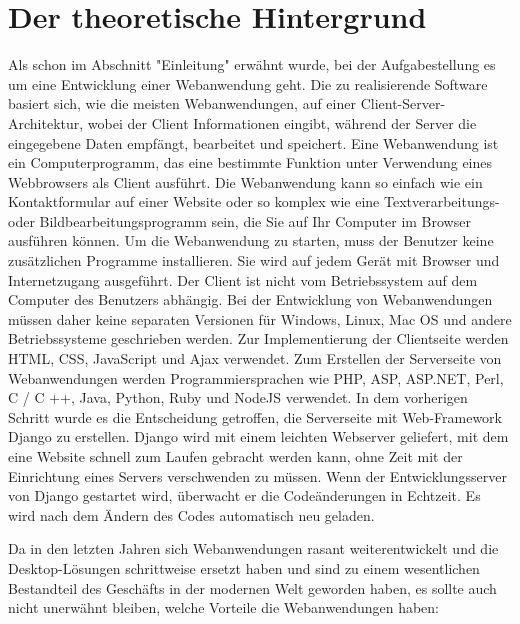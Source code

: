 \chapter{Der theoretische Hintergrund}
\label{sec:theorie}
Als schon im Abschnitt "Einleitung" erwähnt wurde, bei der Aufgabestellung es um eine Entwicklung einer Webanwendung geht. Die zu realisierende Software basiert sich, wie die meisten Webanwendungen, auf einer Client-Server-Architektur, wobei der Client Informationen eingibt, während der Server die eingegebene Daten empfängt, bearbeitet und speichert. Eine Webanwendung ist ein Computerprogramm, das eine bestimmte Funktion unter Verwendung eines Webbrowsers als Client ausführt. Die Webanwendung kann so einfach wie ein Kontaktformular auf einer Website oder so komplex wie eine Textverarbeitungs- oder Bildbearbeitungsprogramm sein, die Sie auf Ihr Computer im Browser ausführen können. Um die Webanwendung zu starten, muss der Benutzer keine zusätzlichen Programme installieren. Sie wird auf jedem Gerät mit Browser und Internetzugang ausgeführt. Der Client ist nicht vom Betriebssystem auf dem Computer des Benutzers abhängig. Bei der Entwicklung von Webanwendungen müssen daher keine separaten Versionen für Windows, Linux, Mac OS und andere Betriebssysteme geschrieben werden. Zur Implementierung der Clientseite werden HTML, CSS, JavaScript und Ajax verwendet. Zum Erstellen der Serverseite von Webanwendungen werden Programmiersprachen wie PHP, ASP, ASP.NET, Perl, C / C ++, Java, Python, Ruby und NodeJS verwendet. In dem vorherigen Schritt wurde es die Entscheidung getroffen, die Serverseite mit Web-Framework Django zu erstellen. Django wird mit einem leichten Webserver geliefert, mit dem eine  Website schnell zum Laufen gebracht werden kann, ohne Zeit mit der Einrichtung eines Servers verschwenden zu müssen. Wenn der Entwicklungsserver von Django gestartet wird, überwacht er die Codeänderungen in Echtzeit. Es wird nach dem Ändern des Codes automatisch neu geladen.

Da in den letzten Jahren sich Webanwendungen rasant weiterentwickelt und die Desktop-Lösungen schrittweise ersetzt haben und sind zu einem wesentlichen Bestandteil des Geschäfts in der modernen Welt geworden haben, es sollte auch nicht unerwähnt bleiben, welche Vorteile die Webanwendungen haben:

